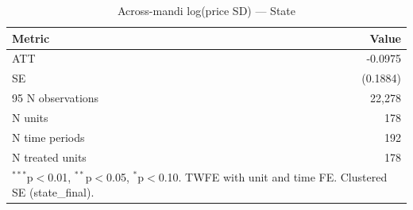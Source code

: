 \begin{table}[htbp]
\centering
\caption{Across-mandi log(price SD) — State}
\label{tab:spec3_across_state_pooled}
\begin{tabular}{lr}
\hline\hline
Metric & Value \\
\hline
ATT & -0.0975 \\
SE & (0.1884) \\
95%
N observations & 22,278 \\
N units & 178 \\
N time periods & 192 \\
N treated units & 178 \\
\hline\hline
\multicolumn{2}{l}{\footnotesize $^{***}$p$<$0.01, $^{**}$p$<$0.05, $^{*}$p$<$0.10. TWFE with unit and time FE. Clustered SE (state_final).} \\
\end{tabular}
\end{table}